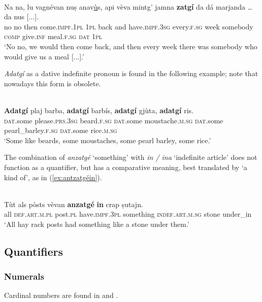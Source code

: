 \ea
\label{}
\\
 \gll Na na, lu vagnévan nuṣ anav\underline{ù}s, api vèva mintg’ jamna \textbf{zatgí} da dá marjanda … da nus [...].\\
 no no then come.\textsc{impf.1pl} \textsc{1pl} back and have.\textsc{impf.3sg} every.\textsc{f.sg}  week somebody \textsc{comp} give.\textsc{inf} meal.\textsc{f.sg} {} \textsc{dat} \textsc{1pl}\\
 \glt `No no, we would then come back, and then every week there was somebody who would give us a meal [...].'
 \z 
 
\textit{Adatgí} as a dative indefinite pronoun is found in the following example; note that nowadays this form is obsolete.

\ea\label{}
\\
\gll  \textbf{Adatgí} plaj barba, \textbf{adatgí} barbís, \textbf{adatgí} gjùta, \textbf{adatgí} ris. \\
\textsc{dat}.some please.\textsc{prs.3sg} beard.\textsc{f.sg}  \textsc{dat}.some moustache.\textsc{m.sg} \textsc{dat}.some pearl\_barley.\textsc{f.sg} \textsc{dat}.some rice.\textsc{m.sg} \\
\glt `Some like beards, some moustaches, some pearl barley, some rice.'
\z

The combination of \textit{anzatgé} `something' with \textit{in / ina} `indefinite article' does not function as a quantifier, but has a comparative meaning, best translated by `a kind of', as in (\ref{ex:antzatgéin}).

\ea\label{ex:antzatgéin}
\\
\gll   Tùt als pòsts vèvan \textbf{anzatgé} \textbf{in} crap ṣutajn.\\
all \textsc{def.art.m.pl} post.\textsc{pl} have.\textsc{impf.3pl} something \textsc{indef.art.m.sg} stone under\_in\\
\glt `All hay rack posts had something like a stone under them.'
\z

\subsection{Quantifiers}

\subsubsection{Numerals}
Cardinal numbers are found in  and .


